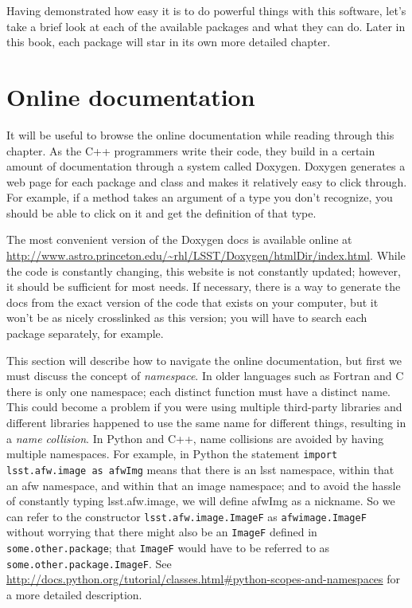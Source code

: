 
Having demonstrated how easy it is to do powerful things with this
software, let's take a brief look at each of the available packages
and what they can do.  Later in this book, each package will star in
its own more detailed chapter.

\section{Online documentation}

It will be useful to browse the online documentation while reading
through this chapter.  As the C++ programmers write their code, they
build in a certain amount of documentation through a system called
Doxygen.  Doxygen generates a web page for each package and class and
makes it relatively easy to click through.  For example, if a method
takes an argument of a type you don't recognize, you should be able to
click on it and get the definition of that type.

The most convenient version of the Doxygen docs is available online at
\url{http://www.astro.princeton.edu/~rhl/LSST/Doxygen/htmlDir/index.html}.
While the code is constantly changing, this website is not constantly
updated; however, it should be sufficient for most needs.  If necessary,
there is a way to generate the docs from the exact version of the code that
exists on your computer, but it won't be as nicely crosslinked as this
version; you will have to search each package separately, for example.

This section will describe how to navigate the online documentation,
but first we must discuss the concept of {\it namespace}.  In older
languages such as Fortran and C there is only one namespace; each
distinct function must have a distinct name.  This could become a
problem if you were using multiple third-party libraries and different
libraries happened to use the same name for different things,
resulting in a {\it name collision}.  In Python and C++, name
collisions are avoided by having multiple namespaces.  For example, in
Python the statement \texttt{import lsst.afw.image as afwImg} means
that there is an lsst namespace, within that an afw namespace, and
within that an image namespace; and to avoid the hassle of constantly
typing lsst.afw.image, we will define afwImg as a nickname.  So we can
refer to the constructor \texttt{lsst.afw.image.ImageF} as \texttt{afwimage.ImageF}
without worrying that there might also be an \texttt{ImageF} defined
in \texttt{some.other.package}; that \texttt{ImageF} would have to be
referred to as \texttt{some.other.package.ImageF}.  See
\url{http://docs.python.org/tutorial/classes.html#python-scopes-and-namespaces}
for a more detailed description.


